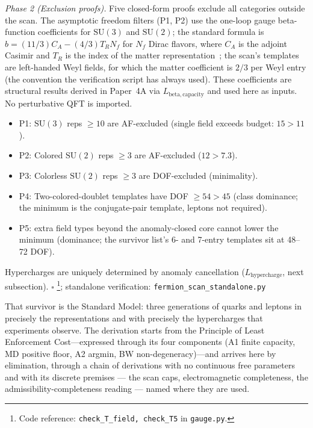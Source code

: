 \documentclass[11pt]{article}
\newenvironment{varlist}{\begin{itemize}[nosep,leftmargin=2em]}{\end{itemize}}
\newcommand{\coderef}[2]{\footnote{Code reference: \texttt{#1} in \texttt{#2}.}}
\newcommand{\SU}{\mathrm{SU}}
\begin{document}
\begin{tcolorbox}[apfbox, title={Theorem $T_{\mathrm{field}}$ (SM Fermion Content)}]
\textit{Phase 2 (Exclusion proofs).}  Five closed-form proofs exclude all categories outside the scan.  The asymptotic freedom filters (P1, P2) use the one-loop gauge beta-function coefficients for $\SU(3)$ and $\SU(2)$; the standard formula is $b = (11/3)C_A - (4/3)T_R N_f$ for $N_f$ Dirac flavors, where $C_A$ is the adjoint Casimir and $T_R$ is the index of the matter representation~\cite{PeskinSchroeder1995}; the scan's templates are left-handed Weyl fields, for which the matter coefficient is $2/3$ per Weyl entry (the convention the verification script has always used).  These coefficients are structural results derived in Paper~4A via $L_{\mathrm{beta,capacity}}$ and used here as inputs.  No perturbative QFT is imported.
\begin{varlist}
\item P1: $\SU(3)$ reps $\ge 10$ are AF-excluded (single field exceeds budget: $15 > 11$).
\item P2: Colored $\SU(2)$ reps $\ge 3$ are AF-excluded ($12 > 7.3$).
\item P3: Colorless $\SU(2)$ reps $\ge 3$ are DOF-excluded (minimality).
\item P4: Two-colored-doublet templates have DOF $\ge 54 > 45$ (class dominance; the minimum is the conjugate-pair template, leptons not required).
\item P5: extra field types beyond the anomaly-closed core cannot lower the minimum (dominance; the survivor list's 6- and 7-entry templates sit at 48--72 DOF).
\end{varlist}

Hypercharges are uniquely determined by anomaly cancellation ($L_{\mathrm{hypercharge}}$, next subsection).  $\square$
\coderef{check\_T\_field, check\_T5}{gauge.py}; standalone verification: \texttt{fermion\_scan\_standalone.py}~\cite{BrookeFermionScan}
\end{tcolorbox}

That survivor is the Standard Model: three generations of quarks and leptons in precisely the representations and with precisely the hypercharges that experiments observe.  The derivation starts from the Principle of Least Enforcement Cost---expressed through its four components (A1 finite capacity, MD positive floor, A2 argmin, BW non-degeneracy)---and arrives here by elimination, through a chain of derivations with no continuous free parameters and with its discrete premises --- the scan caps, electromagnetic completeness, the admissibility-completeness reading --- named where they are used.
\end{document}
